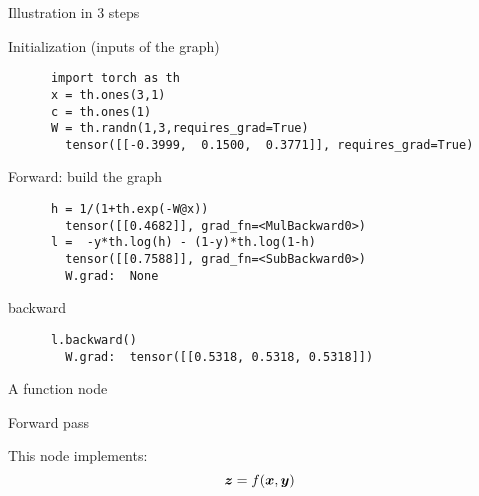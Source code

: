 \begin{frame}[fragile]{Illustration in 3 steps}
  \small
  \begin{block}{Initialization (inputs of the graph)}
    \begin{verbatim}
      import torch as th
      x = th.ones(3,1)
      c = th.ones(1)
      W = th.randn(1,3,requires_grad=True)
        tensor([[-0.3999,  0.1500,  0.3771]], requires_grad=True)
    \end{verbatim}
  \end{block}

  \begin{block}{Forward: build the graph}
    \begin{verbatim}
      h = 1/(1+th.exp(-W@x))
        tensor([[0.4682]], grad_fn=<MulBackward0>)
      l =  -y*th.log(h) - (1-y)*th.log(1-h) 
        tensor([[0.7588]], grad_fn=<SubBackward0>)
        W.grad:  None
    \end{verbatim}
  \end{block}
  \begin{block}{backward}
    \begin{verbatim}
      l.backward() 
        W.grad:  tensor([[0.5318, 0.5318, 0.5318]])
    \end{verbatim}
  \end{block}
\end{frame}


\begin{frame}{A function node}
  \begin{block}{Forward pass}
    \begin{center}
    \end{center}
    This node implements: 
    $$ \boldsymbol{z} = f(\boldsymbol{x},\boldsymbol{y})$$
  \end{block}

\end{frame}

